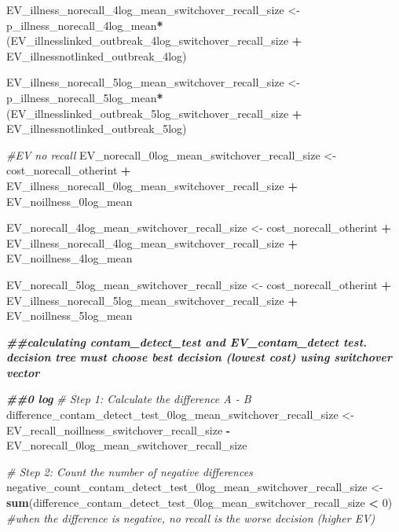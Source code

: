 \documentclass[
]{article}
\newenvironment{Shaded}{\begin{snugshade}}{\end{snugshade}}
\newcommand{\CommentTok}[1]{\textcolor[rgb]{0.56,0.35,0.01}{\textit{#1}}}
\newcommand{\DecValTok}[1]{\textcolor[rgb]{0.00,0.00,0.81}{#1}}
\newcommand{\DocumentationTok}[1]{\textcolor[rgb]{0.56,0.35,0.01}{\textbf{\textit{#1}}}}
\newcommand{\FunctionTok}[1]{\textcolor[rgb]{0.13,0.29,0.53}{\textbf{#1}}}
\newcommand{\NormalTok}[1]{#1}
\newcommand{\OtherTok}[1]{\textcolor[rgb]{0.56,0.35,0.01}{#1}}
\newcommand{\SpecialCharTok}[1]{\textcolor[rgb]{0.81,0.36,0.00}{\textbf{#1}}}
\begin{document}
\begin{Shaded}
\begin{Highlighting}[]
\NormalTok{EV\_illness\_norecall\_4log\_mean\_switchover\_recall\_size }\OtherTok{\textless{}{-}}\NormalTok{ p\_illness\_norecall\_4log\_mean}\SpecialCharTok{*}\NormalTok{(EV\_illnesslinked\_outbreak\_4log\_switchover\_recall\_size }\SpecialCharTok{+}\NormalTok{ EV\_illnessnotlinked\_outbreak\_4log)}

\NormalTok{EV\_illness\_norecall\_5log\_mean\_switchover\_recall\_size }\OtherTok{\textless{}{-}}\NormalTok{ p\_illness\_norecall\_5log\_mean}\SpecialCharTok{*}\NormalTok{(EV\_illnesslinked\_outbreak\_5log\_switchover\_recall\_size }\SpecialCharTok{+}\NormalTok{ EV\_illnessnotlinked\_outbreak\_5log)}


\CommentTok{\#EV no recall}
\NormalTok{EV\_norecall\_0log\_mean\_switchover\_recall\_size }\OtherTok{\textless{}{-}}\NormalTok{ cost\_norecall\_otherint }\SpecialCharTok{+}\NormalTok{ EV\_illness\_norecall\_0log\_mean\_switchover\_recall\_size }\SpecialCharTok{+}\NormalTok{ EV\_noillness\_0log\_mean}

\NormalTok{EV\_norecall\_4log\_mean\_switchover\_recall\_size }\OtherTok{\textless{}{-}}\NormalTok{ cost\_norecall\_otherint }\SpecialCharTok{+}\NormalTok{ EV\_illness\_norecall\_4log\_mean\_switchover\_recall\_size }\SpecialCharTok{+}\NormalTok{ EV\_noillness\_4log\_mean}

\NormalTok{EV\_norecall\_5log\_mean\_switchover\_recall\_size }\OtherTok{\textless{}{-}}\NormalTok{ cost\_norecall\_otherint }\SpecialCharTok{+}\NormalTok{ EV\_illness\_norecall\_5log\_mean\_switchover\_recall\_size }\SpecialCharTok{+}\NormalTok{ EV\_noillness\_5log\_mean}


\DocumentationTok{\#\#calculating contam\_detect\_test and EV\_contam\_detect test. decision tree must choose best decision (lowest cost) using switchover vector}

\DocumentationTok{\#\#0 log}
\CommentTok{\# Step 1: Calculate the difference A {-} B}
\NormalTok{difference\_contam\_detect\_test\_0log\_mean\_switchover\_recall\_size }\OtherTok{\textless{}{-}}\NormalTok{ EV\_recall\_noillness\_switchover\_recall\_size }\SpecialCharTok{{-}}\NormalTok{ EV\_norecall\_0log\_mean\_switchover\_recall\_size}

\CommentTok{\# Step 2: Count the number of negative differences}
\NormalTok{negative\_count\_contam\_detect\_test\_0log\_mean\_switchover\_recall\_size }\OtherTok{\textless{}{-}} \FunctionTok{sum}\NormalTok{(difference\_contam\_detect\_test\_0log\_mean\_switchover\_recall\_size }\SpecialCharTok{\textless{}} \DecValTok{0}\NormalTok{) }\CommentTok{\#when the difference is negative, no recall is the worse decision (higher EV)}


\end{Highlighting}
\end{Shaded}
\end{document}

